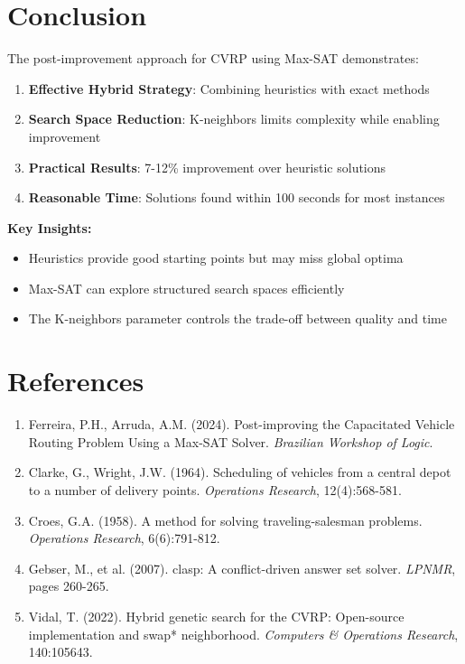 \documentclass[12pt,a4paper]{article}
\theoremstyle{definition}
\begin{document}
\section{Conclusion}

The post-improvement approach for CVRP using Max-SAT demonstrates:

\begin{enumerate}
    \item \textbf{Effective Hybrid Strategy}: Combining heuristics with exact methods
    \item \textbf{Search Space Reduction}: K-neighbors limits complexity while enabling improvement
    \item \textbf{Practical Results}: 7-12\% improvement over heuristic solutions
    \item \textbf{Reasonable Time}: Solutions found within 100 seconds for most instances
\end{enumerate}

\textbf{Key Insights:}
\begin{itemize}
    \item Heuristics provide good starting points but may miss global optima
    \item Max-SAT can explore structured search spaces efficiently
    \item The K-neighbors parameter controls the trade-off between quality and time
\end{itemize}

\section*{References}

\begin{enumerate}
    \item Ferreira, P.H., Arruda, A.M. (2024). Post-improving the Capacitated Vehicle Routing Problem Using a Max-SAT Solver. \textit{Brazilian Workshop of Logic}.
    
    \item Clarke, G., Wright, J.W. (1964). Scheduling of vehicles from a central depot to a number of delivery points. \textit{Operations Research}, 12(4):568-581.
    
    \item Croes, G.A. (1958). A method for solving traveling-salesman problems. \textit{Operations Research}, 6(6):791-812.
    
    \item Gebser, M., et al. (2007). clasp: A conflict-driven answer set solver. \textit{LPNMR}, pages 260-265.
    
    \item Vidal, T. (2022). Hybrid genetic search for the CVRP: Open-source implementation and swap* neighborhood. \textit{Computers \& Operations Research}, 140:105643.
\end{enumerate}
\end{document}
